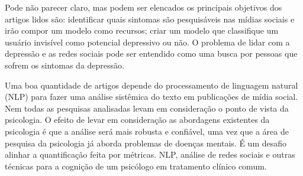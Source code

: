 \documentclass[11pt, notitlepage]{article} %
\begin{document}
Pode não parecer claro, mas podem ser elencados os principais objetivos dos artigos lidos são: identificar quais sintomas são pesquisáveis nas mídias sociais e irão compor um modelo como recursos; criar um modelo que classifique um usuário invisível como potencial depressivo ou não. O problema de lidar com a depressão e as redes sociais pode ser entendido como uma busca por pessoas que sofrem os sintomas da depressão.

Uma boa quantidade de artigos depende do processamento de linguagem natural (NLP) para fazer uma análise sistêmica do texto em publicações de mídia social. Nem todas as pesquisas analisadas levam em consideração o ponto de vista da psicologia. O efeito de levar em consideração as abordagens existentes da psicologia é que a análise será mais robusta e confiável, uma vez que a área de pesquisa da psicologia já aborda problemas de doenças mentais. É um desafio alinhar a quantificação feita por métricas. NLP, análise de redes sociais e outras técnicas para a cognição de um psicólogo em tratamento clínico comum.
\end{document}
